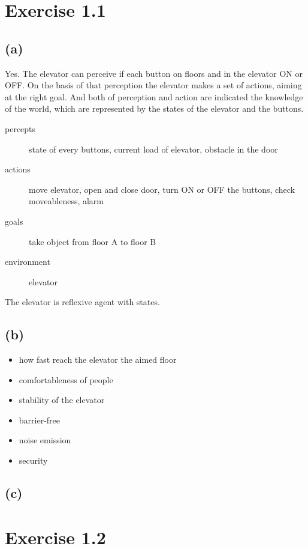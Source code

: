 \documentclass[a4paper,11pt]{scrartcl}
\begin{document}
\section*{Exercise 1.1}

\subsection*{(a)}

	Yes. The elevator can perceive if each button on floors and in the elevator ON or OFF. On the basis of that perception the elevator makes a set of actions, aiming at the right goal. And both of perception and action are indicated the knowledge of the world, which are represented by the states of the elevator and the buttons.\\
		
	\begin{description}
		\item[percepts] state of every buttons, current load of elevator, obstacle in the door
		\item[actions] move elevator, open and close door, turn ON or OFF the buttons, check moveableness, alarm
		\item[goals] take object from floor A to floor B
		\item[environment] elevator
	\end{description}
	
	The elevator is reflexive agent with states.
	
\subsection*{(b)}
	
	\begin{itemize}
		\item	how fast reach the elevator the aimed floor
		\item	comfortableness of people
		\item	stability of the elevator
		\item	barrier-free
		\item	noise emission
		\item	security
	\end{itemize}

\subsection*{(c)}


\section*{Exercise 1.2}
\end{document}
